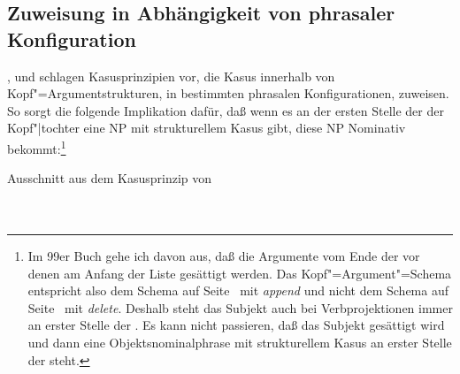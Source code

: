 \subsection{Zuweisung in Abhängigkeit von phrasaler Konfiguration}

\mbox{},  und 
schlagen Kasusprinzipien vor, die Kasus innerhalb von Kopf"=Argumentstrukturen, \dash in bestimmten
phrasalen Konfigurationen, zuweisen. So sorgt \zb die folgende Implikation dafür,
daß wenn es an der ersten Stelle der \subcatl der Kopf"|tochter eine NP mit strukturellem
Kasus gibt, diese NP Nominativ bekommt:\footnote{
  Im 99er Buch gehe ich davon aus, daß die Argumente vom Ende der \subcatl vor denen am Anfang der
  Liste gesättigt werden. Das Kopf"=Argument"=Schema entspricht also dem Schema auf
  Seite~\pageref{schema-bin-prel} mit \emph{append}   und nicht dem Schema auf
  Seite~\pageref{schema-bin-prel2} mit \emph{delete}. Deshalb steht das Subjekt auch bei
  Verbprojektionen immer an erster Stelle der \subcatl. Es kann nicht passieren, daß das Subjekt
  gesättigt wird und dann eine Objektsnominalphrase mit strukturellem Kasus an erster Stelle der \subcatl steht.%
}

\eas
Ausschnitt aus dem Kasusprinzip von \\
 ~\impl \\ \\
\mbox{}\hspace{3cm}
\zs

